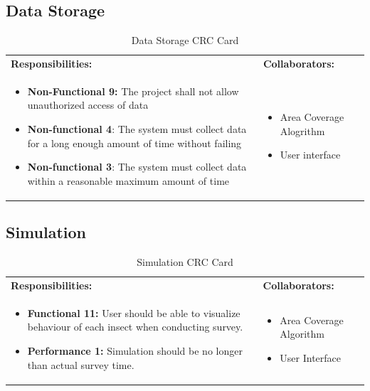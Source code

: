 \documentclass[11pt]{article}
\begin{document}
\subsection{Data Storage}
\begin{table}[H]
\centering
\label{my-label}
\begin{tabular}{ | >{\raggedright\arraybackslash}p{} | >{\raggedright\arraybackslash}p{} | }
\hline
\multicolumn{2}{|c|}{\textbf{HydroSwarm}}             \\ \hline
\textbf{Responsibilities:} & \textbf{Collaborators:} \\ \hline
\begin{itemize}
\item \textbf{Non-Functional 9:} The project shall not allow unauthorized access of data
\item \textbf{Non-functional 4}: The system must collect data for a long enough amount of time without failing
\item \textbf{Non-functional 3}:  The system must collect data within a reasonable maximum amount of time
\end{itemize}
&
\begin{itemize}
\item Area Coverage Alogrithm
\item User interface
\end{itemize} \\ \hline
\end{tabular}
\caption{Data Storage CRC Card}
\end{table}

\subsection{Simulation}
\begin{table}[H]
\centering
\label{my-label}
\begin{tabular}{ | >{\raggedright\arraybackslash}p{} | >{\raggedright\arraybackslash}p{} | }
\hline
\multicolumn{2}{|c|}{\textbf{HydroSwarm}}             \\ \hline
\textbf{Responsibilities:} & \textbf{Collaborators:} \\ \hline
\begin{itemize}
\item \textbf{Functional 11:} User should be able to visualize behaviour of each insect when conducting survey. 
\item \textbf{Performance 1:} Simulation should be no longer than actual survey time.
\end{itemize}
&

\begin{itemize}
\item Area Coverage Algorithm
\item User Interface
\end{itemize} \\ \hline
\end{tabular}
\caption{Simulation CRC Card}
\end{table}
\end{document}
